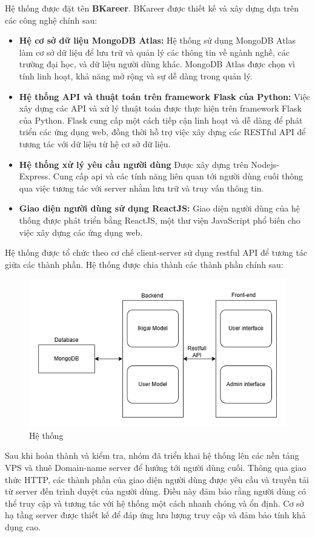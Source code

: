 Hệ thống được đặt tên \textbf{BKareer}.
BKareer được thiết kế và xây dựng dựa trên các công nghệ chính sau:
\begin{itemize}
    \item \textbf{Hệ cơ sở dữ liệu MongoDB Atlas:} Hệ thống sử dụng MongoDB Atlas làm cơ sở dữ liệu để lưu trữ và quản lý các thông tin về ngành nghề, các trường đại học, và dữ liệu người dùng khác. MongoDB Atlas được chọn vì tính linh hoạt, khả năng mở rộng và sự dễ dàng trong quản lý.
    \item \textbf{Hệ thống API và thuật toán trên framework Flask của Python:} Việc xây dựng các API và xử lý thuật toán được thực hiện trên framework Flask của Python. Flask cung cấp một cách tiếp cận linh hoạt và dễ dàng để phát triển các ứng dụng web, đồng thời hỗ trợ việc xây dựng các RESTful API để tương tác với dữ liệu từ hệ cơ sở dữ liệu.
    \item \textbf{Hệ thống xử lý yêu cầu người dùng} Được xây dựng trên Nodejs-Express. Cung cấp api và các tính năng liên quan tới người dùng cuối thông qua việc tương tác với server nhằm lưu trữ và truy vấn thông tin. 
    \item \textbf{Giao diện người dùng sử dụng ReactJS:} Giao diện người dùng của hệ thống được phát triển bằng ReactJS, một thư viện JavaScript phổ biến cho việc xây dựng các ứng dụng web.
\end{itemize}

Hệ thống được tổ chức theo cơ chế client-server sử dụng restful API để tương tác giữa các thành phần. Hệ thống được chia thành các thành phần chính sau:
\begin{figure}[H]
    \centering
    \includegraphics[width=0.7\linewidth]{images/sys.png}
    \vspace{0.5cm}
    \caption{Hệ thống}
\end{figure}

Sau khi hoàn thành và kiểm tra, nhóm đã triển khai hệ thống lên các nền tảng VPS và thuê Domain-name server để hướng tới người dùng cuối. Thông qua giao thức HTTP, các thành phần của giao diện người dùng được yêu cầu và truyền tải từ server đến trình duyệt của người dùng. Điều này đảm bảo rằng người dùng có thể truy cập và tương tác với hệ thống một cách nhanh chóng và ổn định. Cơ sở hạ tầng server được thiết kế để đáp ứng lưu lượng truy cập và đảm bảo tính khả dụng cao.


